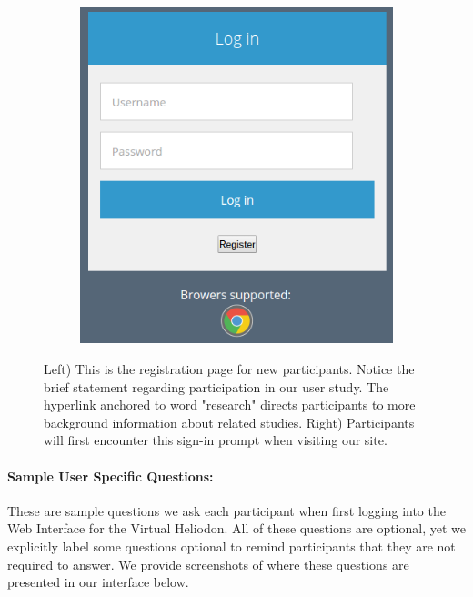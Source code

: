 \documentclass[12pt]{article}
\begin{document}
\begin{figure}[h]
\begin{subfigure}{.5\textwidth}
    \includegraphics[scale=0.5]{ss_sign}
  \end{subfigure}

\caption{Left) This is the registration page for new participants. Notice the brief statement regarding participation in our user study. The hyperlink anchored to word "research" directs participants to more background information about related studies. Right) Participants will first encounter this sign-in prompt when visiting our site.}  

\label{fig:registration}
\end{figure}

\newpage
\paragraph{Sample User Specific Questions:}
These are sample questions we ask each participant when first logging into the Web Interface for the Virtual Heliodon.
All of these questions are optional, yet we explicitly label some questions optional to remind participants that they are not required to answer. 
We provide screenshots of where these questions are presented in our interface below.
\end{document}
